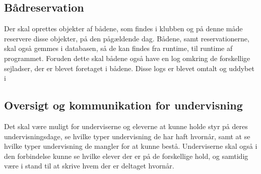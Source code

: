 \subsection{Bådreservation}

Der skal oprettes objekter af bådene, som findes i klubben og på denne måde reservere disse objekter, på den pågældende dag. 
Bådene, samt reservationerne, skal også gemmes i databasen, så de kan findes fra runtime, til runtime af programmet.
Foruden dette skal bådene også have en log omkring de forskellige sejladser, der er blevet foretaget i bådene. Disse logs er blevet omtalt og uddybet i 

\subsection{Oversigt og kommunikation for undervisning}

Det skal være muligt for underviserne og eleverne at kunne holde styr på deres undervisningsdage, se hvilke typer
undervisning de har haft hvornår, samt at se hvilke typer undervisning de mangler for at kunne bestå. Underviserne skal også i den forbindelse kunne se hvilke elever der er på de forskellige hold, og samtidig være i stand til at skrive hvem der er deltaget hvornår.
